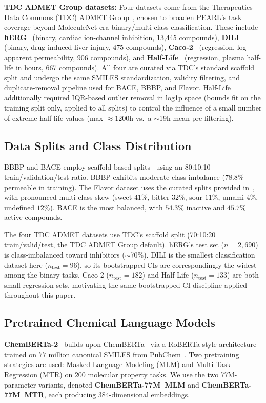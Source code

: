 \documentclass[final,1p,times]{elsarticle}
\begin{document}
\textbf{TDC ADMET Group datasets:} Four datasets come from the Therapeutics Data Commons (TDC) ADMET Group~\cite{huang2021tdc}, chosen to broaden PEARL's task coverage beyond MoleculeNet-era binary/multi-class classification. These include \textbf{hERG}~\cite{wang2016herg} (binary, cardiac ion-channel inhibition, 13{,}445 compounds), \textbf{DILI}~\cite{xu2019dili} (binary, drug-induced liver injury, 475 compounds), \textbf{Caco-2}~\cite{wang2016caco2} (regression, log apparent permeability, 906 compounds), and \textbf{Half-Life}~\cite{obach2008half} (regression, plasma half-life in hours, 667 compounds). All four are curated via TDC's standard scaffold split and undergo the same SMILES standardization, validity filtering, and duplicate-removal pipeline used for BACE, BBBP, and Flavor. Half-Life additionally required IQR-based outlier removal in log1p space (bounds fit on the training split only, applied to all splits) to control the influence of a small number of extreme half-life values (max $\approx 1200$h vs.\ a $\sim$19h mean pre-filtering).

\subsection{Data Splits and Class Distribution} \label{data_splits_distribution}
BBBP and BACE employ scaffold-based splits~\cite{ramsundar2019deep} using an 80:10:10 train/validation/test ratio. BBBP exhibits moderate class imbalance (78.8\% permeable in training). The Flavor dataset uses the curated splits provided in~\cite{zimmermann2024fart}, with pronounced multi-class skew (sweet $41\%$, bitter $32\%$, sour $11\%$, umami $4\%$, undefined $12\%$). BACE is the most balanced, with $54.3\%$ inactive and $45.7\%$ active compounds.

The four TDC ADMET datasets use TDC's scaffold split (70:10:20 train/valid/test, the TDC ADMET Group default). hERG's test set ($n=2{,}690$) is class-imbalanced toward inhibitors ($\sim$70\%). DILI is the smallest classification dataset here ($n_\text{test}=96$), so its bootstrapped CIs are correspondingly the widest among the binary tasks. Caco-2 ($n_\text{test}=182$) and Half-Life ($n_\text{test}=133$) are both small regression sets, motivating the same bootstrapped-CI discipline applied throughout this paper.

\subsection{Pretrained Chemical Language Models} \label{Pre_CLMs}
\textbf{ChemBERTa-2}~\cite{ahmad2022chemberta2} builds upon ChemBERTa~\cite{chithrananda2020chemberta} via a RoBERTa-style architecture trained on $77$ million canonical SMILES from PubChem~\cite{kim2023pubchem}. Two pretraining strategies are used: Masked Language Modeling (MLM) and Multi-Task Regression (MTR) on $200$ molecular property tasks. We use the two 77M-parameter variants, denoted \textbf{ChemBERTa-77M~MLM} and \textbf{ChemBERTa-77M~MTR}, each producing 384-dimensional embeddings.
\end{document}

